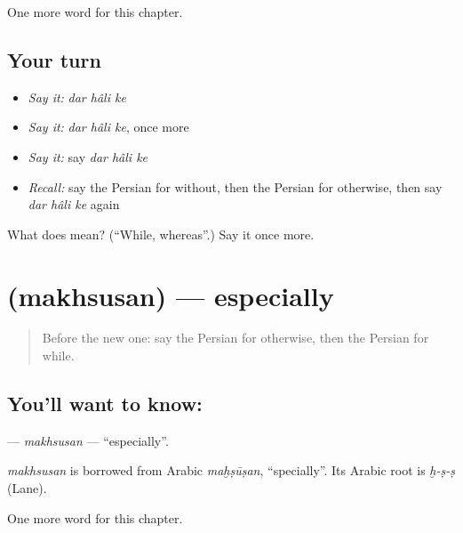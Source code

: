 \begin{grammarlens}[title={What you've built}]
One more word for this chapter.
\end{grammarlens}

\subsection*{Your turn}
\begin{itemize}
\raggedright
  \item \emph{Say it:} \emph{dar hâli ke}
  \item \emph{Say it:} \emph{dar hâli ke}, once more
  \item \emph{Say it:} say \emph{dar hâli ke}
  \item \emph{Recall:} say the Persian for without, then the Persian for otherwise, then say \emph{dar hâli ke} again
\end{itemize}

\begin{tcolorbox}[breakable,colback=teal!4,colframe=teal!35!black,title={Before you move on}]
What does    mean? (\textquotedblleft{}While, whereas\textquotedblright{}.) Say it once more.
\end{tcolorbox}
\section[\texorpdfstring{\fa{مخصوصا} (makhsusan)}{مخصوصا (makhsusan)}]{ (makhsusan) — especially}

\label{lesson:FA-C159-makhsusan}



\begin{quote}
Before the new one: say the Persian for otherwise, then the Persian for while.
\end{quote}

\subsection*{You'll want to know: }
\textbf{} — \emph{makhsusan} — \textquotedblleft{}especially\textquotedblright{}.

\begin{cousinweb}
\emph{makhsusan} is borrowed from Arabic \emph{maḫṣūṣan}, \textquotedblleft{}specially\textquotedblright{}. Its Arabic root is \emph{ḫ-ṣ-ṣ} (Lane).
\end{cousinweb}

\begin{grammarlens}[title={What you've built}]
One more word for this chapter.
\end{grammarlens}


